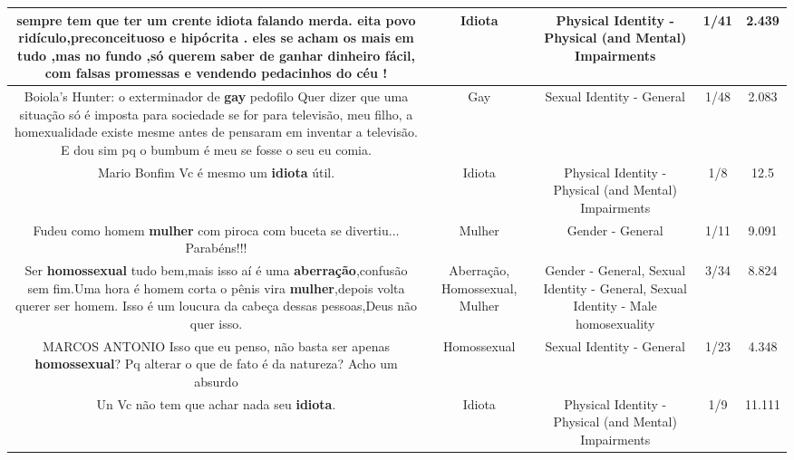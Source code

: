 \documentclass[11pt]{article}
\newlength\mylength
\begin{document}
\begin{center}
\begin{longtable}{|C{.65\mylength}|C{.30\mylength}|C{.12\mylength}|C{.12\mylength}|C{.12\mylength}|}
  \small sempre tem que ter um crente \textbf{idiota} falando merda. eita povo ridículo,preconceituoso e hipócrita . eles se acham os mais em tudo ,mas no fundo ,só querem saber de ganhar dinheiro fácil,  com falsas promessas e vendendo pedacinhos do céu !\normalsize   & Idiota & Physical Identity - Physical (and Mental) Impairments & 1/41 & 2.439 \\  \hline
  \small Boiola's Hunter: o exterminador de \textbf{gay} pedofilo Quer dizer que uma situação só é imposta para sociedade se for para televisão, meu filho, a homexualidade existe mesme antes de pensaram em inventar a televisão. E dou sim pq o bumbum é meu se fosse o seu eu comia.\normalsize   & Gay & Sexual Identity - General & 1/48 & 2.083 \\  \hline
  \small Mario Bonfim Vc é mesmo um \textbf{idiota} útil.\normalsize   & Idiota & Physical Identity - Physical (and Mental) Impairments & 1/8 & 12.5 \\  \hline
  \small Fudeu como homem \textbf{mulher}   com piroca com buceta se divertiu... Parabéns!!!\normalsize   & Mulher & Gender - General & 1/11 & 9.091 \\  \hline
  \small Ser \textbf{homossexual} tudo bem,mais isso aí é uma \textbf{aberração},confusão sem fim.Uma hora é homem corta o pênis vira \textbf{mulher},depois volta querer ser homem. Isso é um loucura da cabeça dessas pessoas,Deus não quer isso.\normalsize   & Aberração, Homossexual, Mulher & Gender - General, Sexual Identity - General, Sexual Identity - Male homosexuality & 3/34 & 8.824 \\  \hline
  \small MARCOS ANTONIO Isso que eu penso, não basta ser apenas \textbf{homossexual}? Pq alterar o que de fato é da natureza? Acho um absurdo\normalsize   & Homossexual & Sexual Identity - General & 1/23 & 4.348 \\  \hline
  \small Un  Vc não tem que achar nada seu \textbf{idiota}.\normalsize   & Idiota & Physical Identity - Physical (and Mental) Impairments & 1/9 & 11.111 \\  \hline

\end{longtable}
\end{center}
\end{document}
